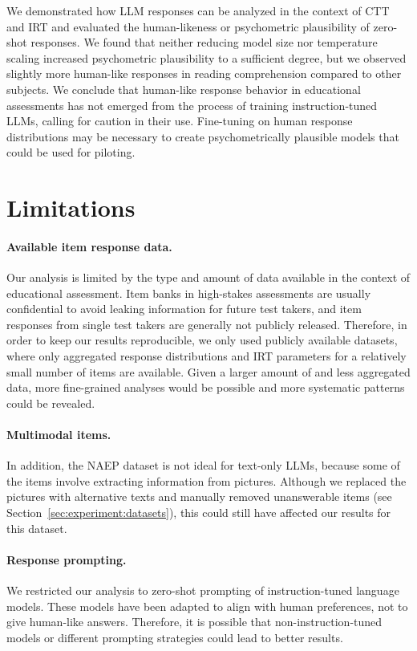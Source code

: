 \documentclass[11pt]{article}
\begin{document}
We demonstrated how LLM responses can be analyzed in the context of CTT and IRT and evaluated the human-likeness or psychometric plausibility of zero-shot responses. We found that neither reducing model size nor temperature scaling increased psychometric plausibility to a sufficient degree, but we observed slightly more human-like responses in reading comprehension compared to other subjects. We conclude that human-like response behavior in educational assessments has not emerged from the process of training instruction-tuned LLMs, calling for caution in their use. Fine-tuning on human response distributions may be necessary to create psychometrically plausible models that could be used for piloting.


\section*{Limitations}

\paragraph{Available item response data.}
Our analysis is limited by the type and amount of data available in the context of educational assessment. Item banks in high-stakes assessments are usually confidential to avoid leaking information for future test takers, and item responses from single test takers are generally not publicly released. Therefore, in order to keep our results reproducible, we only used publicly available datasets, where only aggregated response distributions and IRT parameters for a relatively small number of items are available. Given a larger amount of and less aggregated data, more fine-grained analyses would be possible and more systematic patterns could be revealed.

\paragraph{Multimodal items.}
In addition, the NAEP dataset is not ideal for text-only LLMs, because some of the items involve extracting information from pictures. Although we replaced the pictures with alternative texts and manually removed unanswerable items (see Section~\ref{sec:experiment:datasets}), this could still have affected our results for this dataset.

\paragraph{Response prompting.}
We restricted our analysis to zero-shot prompting of instruction-tuned language models. These models have been adapted to align with human preferences, not to give human-like answers. Therefore, it is possible that non-instruction-tuned models or different prompting strategies could lead to better results.
\end{document}
